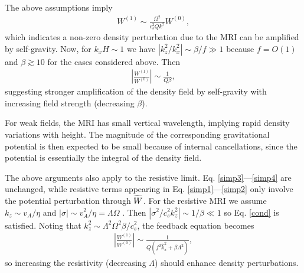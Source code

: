 The above assumptions imply
\begin{align}
  W^{(1)} \sim \frac{\Omega^2}{c_s^2 Q k^2} W^{(0)},\label{feedback}
\end{align} 
which indicates a non-zero density perturbation due to the
MRI can be amplified by self-gravity. Now, for $k_xH\sim 1$ we have
$|k_z^2/k_x^2|\sim \beta/f\gg1$ because $f=O(1)$ and $\beta\gtrsim10$
for the cases considered above. Then
\begin{align}
  \left|\frac{W^{(1)}}{W^{(0)}}\right| \sim \frac{1}{Q\beta}, 
\end{align}
 suggesting stronger amplification of the density field by 
 self-gravity with increasing field strength (decreasing
 $\beta$). 

 For weak fields, the MRI has small vertical wavelength,
 implying rapid density variations with height. The magnitude of the
 corresponding gravitational potential is then expected to be small
 because of internal cancellations, since the potential is essentially
 the integral of the density field. 



The above arguments also apply to the resistive
limit. Eq. \ref{simp3}---\ref{simp4} are unchanged, while resistive
terms appearing in Eq. \ref{simp1}---\ref{simp2} only involve the
potential perturbation through $\widetilde{W}$. For the resistive MRI we assume
$k_z\sim v_A/\eta$ and $|\sigma|\sim v_A^2/\eta = \Lambda\Omega$
\citep{sano99}. Then $|\sigma^2/c_s^2k_z^2|\sim 1/\beta \ll 1$ so
Eq. \ref{cond} is satisfied. Noting that $k_z^2\sim
\Lambda^2\Omega^2\beta/c_s^2$, the feedback equation becomes
\begin{align}
  \left|\frac{W^{(1)}}{W^{(0)}}\right| \sim
  \frac{1}{Q\left(f^2\hat{k}_x^2 + \beta\Lambda^2\right)},
\end{align}
so increasing the resistivity (decreasing $\Lambda$) should enhance
density perturbations. 
 
